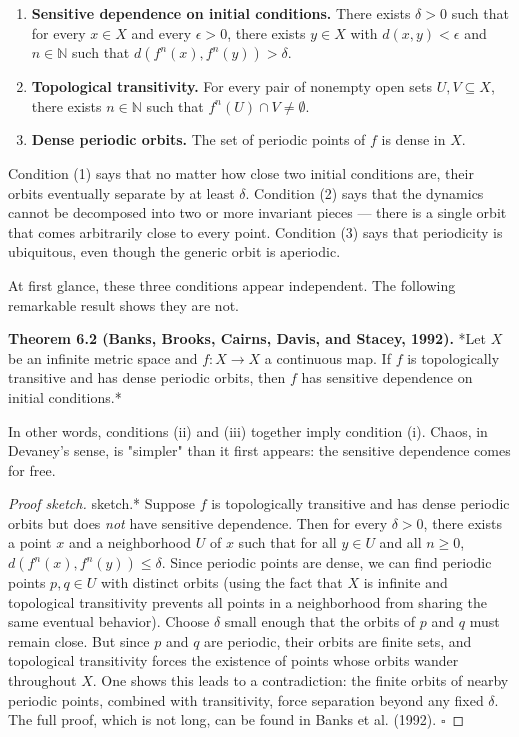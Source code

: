 \begin{enumerate}[nosep]
  \item \textbf{Sensitive dependence on initial conditions.} There exists $\delta > 0$ such that for every $x \in X$ and every $\epsilon > 0$, there exists $y \in X$ with $d(x, y) < \epsilon$ and $n \in \mathbb{N}$ such that $d(f^n(x), f^n(y)) > \delta$.

  \item \textbf{Topological transitivity.} For every pair of nonempty open sets $U, V \subseteq X$, there exists $n \in \mathbb{N}$ such that $f^n(U) \cap V \neq \emptyset$.

  \item \textbf{Dense periodic orbits.} The set of periodic points of $f$ is dense in $X$.
\end{enumerate}

Condition (1) says that no matter how close two initial conditions are, their orbits eventually separate by at least $\delta$. Condition (2) says that the dynamics cannot be decomposed into two or more invariant pieces --- there is a single orbit that comes arbitrarily close to every point. Condition (3) says that periodicity is ubiquitous, even though the generic orbit is aperiodic.

At first glance, these three conditions appear independent. The following remarkable result shows they are not.

\textbf{Theorem 6.2 (Banks, Brooks, Cairns, Davis, and Stacey, 1992).} *Let $X$ be an infinite metric space and $f: X \to X$ a continuous map. If $f$ is topologically transitive and has dense periodic orbits, then $f$ has sensitive dependence on initial conditions.*

In other words, conditions (ii) and (iii) together imply condition (i). Chaos, in Devaney's sense, is "simpler" than it first appears: the sensitive dependence comes for free.

\begin{proof}[Proof sketch]
sketch.* Suppose $f$ is topologically transitive and has dense periodic orbits but does \textit{not} have sensitive dependence. Then for every $\delta > 0$, there exists a point $x$ and a neighborhood $U$ of $x$ such that for all $y \in U$ and all $n \geq 0$, $d(f^n(x), f^n(y)) \leq \delta$. Since periodic points are dense, we can find periodic points $p, q \in U$ with distinct orbits (using the fact that $X$ is infinite and topological transitivity prevents all points in a neighborhood from sharing the same eventual behavior). Choose $\delta$ small enough that the orbits of $p$ and $q$ must remain close. But since $p$ and $q$ are periodic, their orbits are finite sets, and topological transitivity forces the existence of points whose orbits wander throughout $X$. One shows this leads to a contradiction: the finite orbits of nearby periodic points, combined with transitivity, force separation beyond any fixed $\delta$. The full proof, which is not long, can be found in Banks et al. (1992). $\square$

\end{proof}

